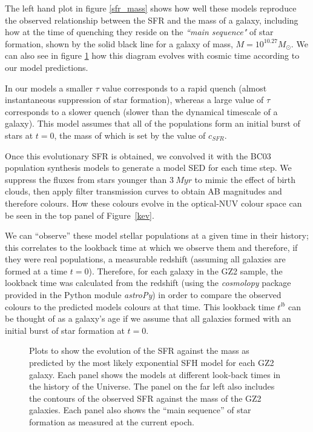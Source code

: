 \documentclass{mn2e}
\begin{document}
The left hand plot in figure \ref{sfr_mass} shows how well these models reproduce the observed relationship between the SFR and the mass of a galaxy, including how at the time of quenching they reside on the \emph{``main sequence"} of star formation, shown by the solid black line for a galaxy of mass, $M = 10^{10.27} M_{\odot}$.  We can also see in figure \ref{sfr_mass_evo} how this diagram evolves with cosmic time according to our model predictions. 

In our models a smaller $\tau$ value corresponds to a rapid quench (almost instantaneous suppression of star formation), whereas a large value of $\tau$ corresponds to a slower quench (slower than the dynamical timescale of a galaxy).  This model assumes that all of the populations form an initial burst of stars at $t=0$, the mass of which is set by the value of $c_{SFR}$. %

Once this evolutionary SFR is obtained, we convolved it with the BC03 population synthesis models to generate a model SED for each time step. We suppress the fluxes from stars younger than $3~Myr$ to mimic the effect of birth clouds, then apply filter transmission curves to obtain AB magnitudes and therefore colours. How these colours evolve in the optical-NUV colour space can be seen in the top panel of Figure~\ref{kev}.


We can ``observe'' these model stellar populations at a given time in their history; this correlates to the lookback time at which we observe them and therefore, if they were real populations, a measurable redshift (assuming all galaxies are formed at a time $t=0$). Therefore, for each galaxy in the GZ2 sample, the lookback time was calculated from the redshift (using the \emph{cosmolopy} package provided in the Python module \emph{astroPy}) in order to compare the observed colours to the predicted models colours at that time. This lookback time $t^{lb}$ can be thought of as a galaxy's age if we assume that all galaxies formed with an initial burst of star formation at $t=0$. 

\begin{figure}
\caption{Plots to show the evolution of the SFR against the mass as predicted by the most likely exponential SFH model for each GZ2 galaxy. Each panel shows the models at different look-back times in the history of the Universe. The panel on the far left also includes the contours of the observed SFR against the mass of the GZ2 galaxies. Each panel also shows the ``main sequence'' of star formation as measured at the current epoch.}
\label{sfr_mass_evo}
\end{figure}
\end{document}
